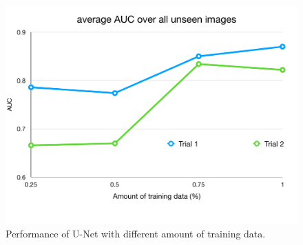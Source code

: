 \documentclass[runningheads]{llncs}
\begin{document}
\def\subFigx{0.8\linewidth}
\begin{figure}[h] 
\centering
\includegraphics[width=\subFigx]{./fig/datagrow/keynote/datagrow_diagram.pdf}
\caption{{ Performance of U-Net with different amount of training data.}}
\label{fig:trend}
\end{figure}








\clearpage



\end{document}
